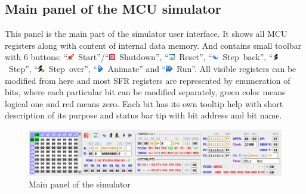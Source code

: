 \documentclass[a4paper,twoside,12pt]{book}
\begin{document}
		\subsection{Main panel of the MCU simulator}
			This panel is the main part of the simulator user interface. It shows all MCU registers along with content of internal data memory. And contains small toolbar with 6 buttons: ``\includegraphics[height=8pt]{img/launch.png}~Start''/``\includegraphics[height=8pt]{img/exit.png}~Shutdown'', ``\includegraphics[height=8pt]{img/rebuild.png}~Reset'', ``\includegraphics[height=8pt]{img/undo.png}~Step~back'', ``\includegraphics[height=8pt]{img/goto.png}~Step'', ``\includegraphics[height=8pt]{img/goto2.png}~Step~over'', ``\includegraphics[height=8pt]{img/1rightarrow.png}~Animate'' and ``\includegraphics[height=8pt]{img/2rightarrow.png}~Run''. All visible registers can be modified from here and most SFR registers are represented by enumeration of bits, where each particular bit can be modified separately, green color means logical one and red means zero. Each bit has its own tooltip help with short description of its purpose and status bar tip with bit address and bit name.
			\begin{figure}[h!]
				\centering{}
				\caption{Main panel of the simulator}
				\includegraphics[width=\textwidth]{img/001.png}
			\end{figure}
\end{document}
